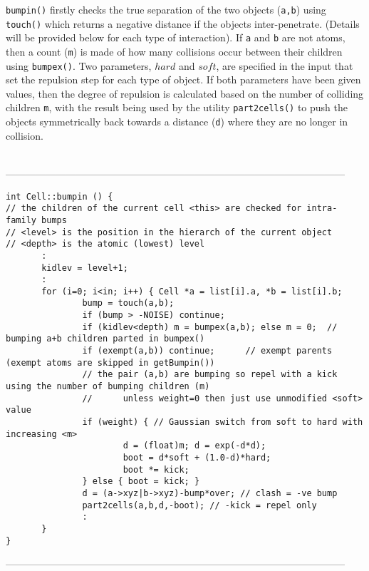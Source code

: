 {\tt bumpin()} firstly checks the true separation of the two objects ({\tt a,b}) using
{\tt touch()} which returns a negative distance if the objects inter-penetrate. (Details
will be provided below for each type of interaction).   If {\tt a} and {\tt b} are not atoms, then
a count ({\tt m}) is made of how many collisions occur between their children using {\tt bumpex()}.
Two parameters,  $hard$ and $soft$, are specified in the input that set the repulsion step
for each type of object.  If both parameters have been given values,
then the degree of repulsion is calculated based on the number of colliding children {\tt m},
with the result being used by the utility {\tt part2cells()} to push the objects symmetrically
back towards a distance ({\tt d}) where they are no longer in collision. 
\begin{singlespace}
\ \\
------------------------------------------------------------------------------------------------------
\begin{tiny}
\begin{verbatim}
int Cell::bumpin () {
// the children of the current cell <this> are checked for intra-family bumps
// <level> is the position in the hierarch of the current object
// <depth> is the atomic (lowest) level
       :
       kidlev = level+1;
       :
       for (i=0; i<in; i++) { Cell *a = list[i].a, *b = list[i].b;
               bump = touch(a,b);
               if (bump > -NOISE) continue;
               if (kidlev<depth) m = bumpex(a,b); else m = 0;  // bumping a+b children parted in bumpex() 
               if (exempt(a,b)) continue;      // exempt parents (exempt atoms are skipped in getBumpin()) 
               // the pair (a,b) are bumping so repel with a kick using the number of bumping children (m)
               //      unless weight=0 then just use unmodified <soft> value
               if (weight) { // Gaussian switch from soft to hard with increasing <m>
                       d = (float)m; d = exp(-d*d);
                       boot = d*soft + (1.0-d)*hard;
                       boot *= kick;
               } else { boot = kick; }
               d = (a->xyz|b->xyz)-bump*over; // clash = -ve bump
               part2cells(a,b,d,-boot); // -kick = repel only
               :
       }
}
\end{verbatim}
\end{tiny}
------------------------------------------------------------------------------------------------------
\end{singlespace}

